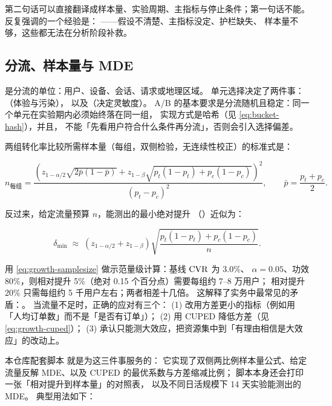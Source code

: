 第二句话可以直接翻译成样本量、实验周期、主指标与停止条件；第一句话不能。
\cite{kohavi2020trustworthy} 反复强调的一个经验是：
——假设不清楚、主指标没定、护栏缺失、
样本量不够，这些都无法在分析阶段补救。

\subsection{分流、样本量与 MDE}

 是分流的单位：用户、设备、会话、请求或地理区域。
单元选择决定了两件事：（体验与污染），
以及（决定灵敏度）。
A/B 的基本要求是分流随机且稳定：同一个单元在实验期内必须始终落在同一组，
实现方式是哈希（见 \cref{eq:bucket-hash}），并且，
不能「先看用户符合什么条件再分流」，否则会引入选择偏差。

两组转化率比较所需样本量（每组，双侧检验，无连续性校正）的标准式是：

\begin{equation}
n_{\text{每组}} = \frac{\left( z_{1-\alpha/2}\sqrt{2\bar p (1-\bar p)}
+ z_{1-\beta}\sqrt{p_t(1-p_t)+p_c(1-p_c)} \right)^{2}}{(p_t-p_c)^{2}} ,
\qquad \bar p = \frac{p_t + p_c}{2} .
\label{eq:growth-samplesize}
\end{equation}

反过来，给定流量预算 $n$，能测出的最小绝对提升
（）近似为：

\begin{equation}
\delta_{\min} \;\approx\; (z_{1-\alpha/2} + z_{1-\beta})
\sqrt{\frac{p_t(1-p_t)+p_c(1-p_c)}{n}} .
\label{eq:growth-mde}
\end{equation}

用 \cref{eq:growth-samplesize} 做示范量级计算：基线 $\operatorname{CVR}$ 为 3.0\%、
$\alpha = 0.05$、功效 80\%，则相对提升 5\%（绝对 0.15 个百分点）需要每组约 7--8 万用户；
相对提升 20\% 只需每组约 5 千用户左右；两者相差十几倍。
这解释了实务中最常见的矛盾：。
当流量不足时，正确的应对有三个：
(1) 改用方差更小的指标（例如用「人均订单数」而不是「是否有订单」）；
(2) 用 CUPED 降低方差（见 \cref{eq:growth-cuped}）；
(3) 承认只能测大效应，把资源集中到「有理由相信是大效应」的改动上。

本仓库配套脚本  就是为这三件事服务的：
它实现了双侧两比例样本量公式、给定流量反解 MDE、以及 CUPED 的最优系数与方差缩减比例；
脚本本身还会打印一张「相对提升到样本量」的对照表，
以及不同日活规模下 14 天实验能测出的 MDE。
典型用法如下：

